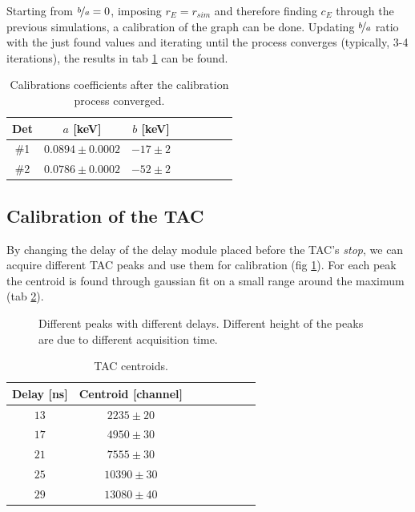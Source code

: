 \documentclass[11pt,a4 paper]{article}
\let\oldfrac\frac
\renewcommand{\frac}[3][d]{\ifthenelse{\equal{#1}{d}}{\oldfrac{#2}{#3}}{\nicefrac{#2}{#3}}}
\begin{document}
Starting from $\frac[f]{b}{a} = 0$, imposing $r_E = r_{sim}$ and therefore finding $c_E$ through the previous simulations, a calibration of the graph can be done. Updating $\frac[f]{b}{a}$ ratio with the just found values and iterating until the process converges (typically, 3-4 iterations), the results in tab \ref{tab:calibr:coeffs} can be found.

\begin{table}[H]
  \centering
  \begin{tabular}{cccccccc}
    \toprule
    Det & $a$ [keV] & $b$ [keV] \\
    \midrule
    \#1 & $0.0894 \pm 0.0002$ & $-17 \pm 2$ \\
    \#2 & $0.0786 \pm 0.0002$ & $-52 \pm 2$ \\
    \bottomrule
  \end{tabular}
  \caption{Calibrations coefficients after the calibration process converged.}
  \label{tab:calibr:coeffs}
\end{table}

\subsection{Calibration of the TAC}

By changing the delay of the delay module placed before the TAC's \emph{stop}, we can acquire different TAC peaks and use them for calibration (fig \ref{fig:tac:calibr}).
For each peak the centroid is found through gaussian fit on a small range around the maximum (tab \ref{tab:tac:calibr}).

\begin{figure}[H]
    \centering
    \caption{Different peaks with different delays. Different height of the peaks are due to different acquisition time.}
    \label{fig:tac:calibr}
\end{figure}

\begin{table}[H]
    \centering
    \begin{tabular}{cccccccc}
        \toprule
        Delay [ns] & Centroid [channel] \\
        \midrule
        $13$ & $2235\pm 20$ \\
        $17$ & $4950\pm 30$ \\
        $21$ & $7555\pm 30$ \\
        $25$ & $10390\pm 30$ \\
        $29$ & $13080\pm 40$ \\
        \bottomrule
    \end{tabular}
    \caption{TAC centroids.}
    \label{tab:tac:calibr}
\end{table}
\end{document}
